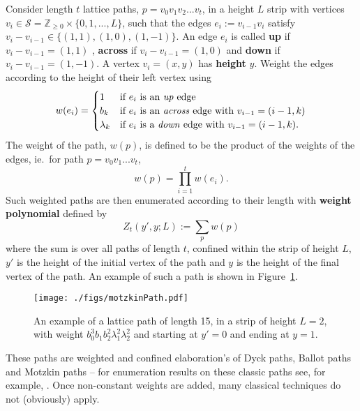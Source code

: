 \documentclass[11pt,a4paper]{article}
\newcommand{\la}{\lambda}
\newcommand{\defin}[1]{\textbf{#1}}		%
\newcommand{\cS}{\mathcal{S}}
\newcommand{\df}{:=}
\begin{document}
Consider length $t$ lattice paths, $p= v_0v_1v_2 ... v_t$, in a height $L$ strip with vertices $v_i\in\cS=\mathbb{Z}_{\ge 0} \times \{0,1,...,L\}$, such that the  edges $e_i \df v_{i-1} v_i$ satisfy $v_i - v_{i-1}\in\{(1,1), (1,0),(1,-1) \}$.  An edge $e_i$  is called \defin{up} if $v_i - v_{i-1}=(1,1)$ , \defin{across} if $v_i - v_{i-1}=(1,0)$ and \defin{down} if $v_i - v_{i-1}=(1,-1)$. A vertex $v_i=(x,y)$ has \textbf{height} $y$.  Weight the edges according to the height  of their left vertex using
\begin{equation} \label{eq:generalpathWeights}
w(e_i) =
\begin{cases}
	1 & \text{if $e_i$ is an \emph{up} edge} \\
	b_{k} & \text{if $e_i$ is an \emph{across} edge with $v_{i-1}=(i-1, k)$}\\
	\la_k & \text{if $e_i$ is a \emph{down} edge with $v_{i-1}=(i-1, k)$}.
\end{cases}
\end{equation}
The weight of the path, $w(p)$, is defined to be the product of the weights of the edges, ie.\ for path $p= v_0   v_1 ... v_t$,
\begin{equation}
w(p) = \prod_{i=1}^t w(e_i).
\end{equation}
Such weighted paths are then enumerated according to their length  with \defin{weight polynomial}  defined by
\begin{equation}\label{eq:weightpoly1}
Z_t(y', y;L) \df  \sum_{p} w(p) 
\end{equation}
where the sum is over all paths of length $t$, confined within the strip of height $L$,  $y'$ is the  height of the initial vertex of the path and $y$ is the height  of the  final vertex of the path. An example of such a path is shown in Figure~\ref{fig:CTschemaRotated}.
\begin{figure}[htbp]
\begin{center}
\texttt{[image: ./figs/motzkinPath.pdf]}
\caption{An example of a lattice path of length 15, in a strip of height $L=2$, with weight $b_0^3b_1b_2^2\lambda_1^2\lambda_2^2$ and starting at $y'=0$ and ending at $y=1$.}
\label{fig:CTschemaRotated}
\end{center}
\end{figure} 
These paths are weighted and confined elaboration's of Dyck paths, Ballot paths and Motzkin paths -- for enumeration results on these classic paths see, for example, \cite{goulden:1983yg}.  Once non-constant weights are added, many classical techniques do not (obviously) apply. 
\end{document}
